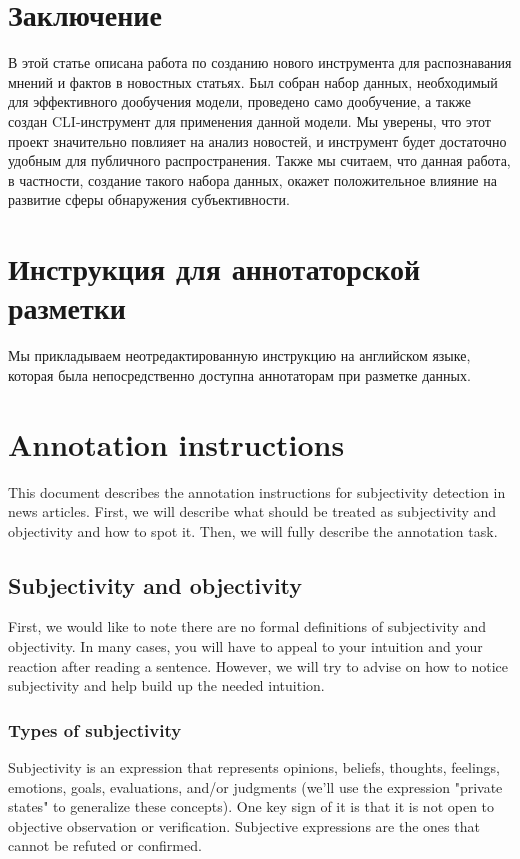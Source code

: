 \documentclass[a4paper,14pt]{extarticle}
\begin{document}
    \section{Заключение}
    В этой статье описана работа по созданию нового инструмента для распознавания мнений и фактов в новостных статьях. Был собран набор данных, необходимый для эффективного дообучения модели, проведено само дообучение, а также создан CLI-инструмент для применения данной модели. Мы уверены, что этот проект значительно повлияет на анализ новостей, и инструмент будет достаточно удобным для публичного распространения. Также мы считаем, что данная работа, в частности, создание такого набора данных, окажет положительное влияние на развитие сферы обнаружения субъективности.
    
\newpage 



	
\newpage
\appendix
\section{Инструкция для аннотаторской разметки}
Мы прикладываем неотредактированную инструкцию на английском языке, которая была непосредственно доступна аннотаторам при разметке данных.

\section*{Annotation instructions}
This document describes the annotation instructions for subjectivity detection in news articles. First, we will describe what should be treated as subjectivity and objectivity and how to spot it. Then, we will fully describe the annotation task.

\subsection*{Subjectivity and objectivity}
First, we would like to note there are no formal definitions of subjectivity and objectivity. In many cases, you will have to appeal to your intuition and your reaction after reading a sentence. However, we will try to advise on how to notice subjectivity and help build up the needed intuition.

\subsubsection*{Types of subjectivity}
Subjectivity is an expression that represents opinions, beliefs, thoughts, feelings, emotions, goals, evaluations, and/or judgments (we'll use the expression "private states" to generalize these concepts). One key sign of it is that it is not open to objective observation or verification. Subjective expressions are the ones that cannot be refuted or confirmed.
\end{document}
